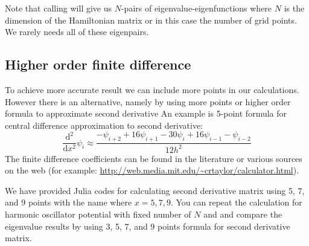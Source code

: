 Note that calling  will give us $N$-pairs of eigenvalue-eigenfunctions where $N$ is the
dimension of the Hamiltonian matrix or in this case the number of grid points. We rarely needs all of these
eigenpairs.

\subsection{Higher order finite difference}

To achieve more accurate result we can include more points in our calculations. However there is an
alternative, namely by using more points or higher order formula to approximate second derivative
An example is 5-point formula for central difference approximation to second derivative:
\begin{equation}
\frac{\mathrm{d}^2}{\mathrm{d}x^2} \psi_{i} \approx
\frac{-\psi_{i+2} + 16\psi_{i+1} - 30\psi_{i} + 16\psi_{i-1} - \psi_{i-2}}{12h^2}
\end{equation}
%
The finite difference coefficients can be found in the literature or various sources on the web (for
example: \url{http://web.media.mit.edu/~crtaylor/calculator.html}).

We have provided Julia codes for calculating second derivative matrix using 5, 7, and 9 points
with the name  where $x=5,7,9$.
You can repeat the calculation for harmonic oscillator potential with fixed number of $N$ and
and compare the eigenvalue results by using 3, 5, 7, and 9 points formula for second
derivative matrix.

%
